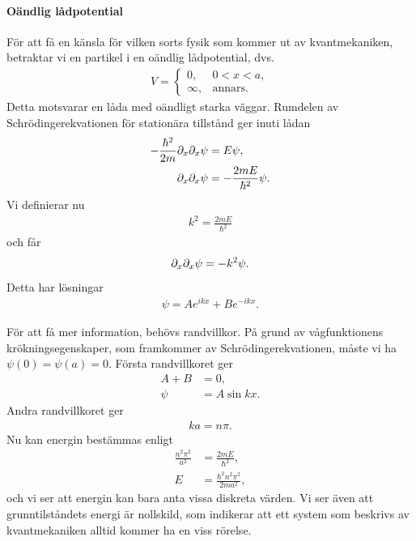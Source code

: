 \paragraph{Oändlig lådpotential}
För att få en känsla för vilken sorts fysik som kommer ut av kvantmekaniken, betraktar vi en partikel i en oändlig lådpotential, dvs.
\begin{align*}
	V = 
	\begin{cases}
		0,      &0 < x < a, \\
		\infty, &\text{annars.}
	\end{cases}
\end{align*}
Detta motsvarar en låda med oändligt starka väggar. Rumdelen av Schrödingerekvationen för stationära tillstånd ger inuti lådan
\begin{align*}
	-\frac{\hbar^{2}}{2m}\partial_{x}\partial_{x}\psi &= E\psi, \\
	\partial_{x}\partial_{x}\psi                      &= -\frac{2mE}{\hbar^{2}}\psi.
\end{align*}
Vi definierar nu
\begin{align*}
	k^{2} = \frac{2mE}{\hbar^{2}}
\end{align*}
och får
\begin{align*}
	\partial_{x}\partial_{x}\psi = -k^{2}\psi.
\end{align*}
Detta har lösningar
\begin{align*}
	\psi = Ae^{ikx} + Be^{-ikx}.
\end{align*}

För att få mer information, behövs randvillkor. På grund av vågfunktionens krökningsegenskaper, som framkommer av Schrödingerekvationen, måste vi ha $\psi(0) = \psi(a) = 0$. Första randvillkoret ger
\begin{align*}
	A + B &= 0, \\
	\psi  &= A\sin{kx}.
\end{align*}
Andra randvillkoret ger
\begin{align*}
	ka = n\pi.
\end{align*}
Nu kan energin bestämmas enligt
\begin{align*}
	\frac{n^{2}\pi^{2}}{a^{2}} &= \frac{2mE}{\hbar^{2}}, \\
	E                          &= \frac{\hbar^{2}n^{2}\pi^{2}}{2ma^{2}},
\end{align*}
och vi ser att energin kan bara anta vissa diskreta värden. Vi ser även att grunntilståndets energi är nollskild, som indikerar att ett system som beskrivs av kvantmekaniken alltid kommer ha en viss rörelse.

